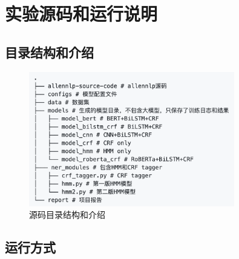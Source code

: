 \documentclass[a4paper, 12pt]{article}
\begin{document}

\section{实验源码和运行说明}

\subsection{目录结构和介绍}

\begin{figure}[htbp]
    \centering
    \includegraphics[width=0.8\textwidth]{folder.png}
    \caption{源码目录结构和介绍}
    \label{fig:}
\end{figure}

\subsection{运行方式}
\end{document}
